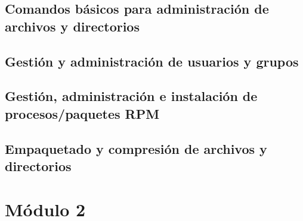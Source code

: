\documentclass{beamer}
\begin{document}
\subsection{Comandos básicos para administración de archivos y directorios}
\subsection{Gestión y administración de usuarios y grupos}
\subsection{Gestión, administración e instalación de procesos/paquetes RPM}
\subsection{Empaquetado y compresión de archivos y directorios}
\section{Módulo 2}






\end{document}
